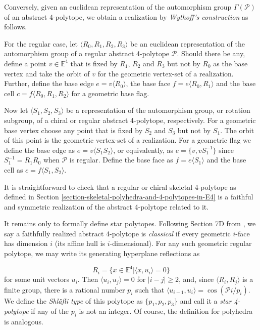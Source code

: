 \documentclass{amsart}
\begin{document}
Conversely, given an euclidean representation of the automorphism group
$\Gamma(\mathcal{P})$ of an abstract 4-polytope, we obtain a realization by
\textit{Wythoff's construction} as follows.
	
For the regular case, let $\langle R_0, R_1,R_2,R_3\rangle$ be an euclidean
representation of the automorphism group of a regular abstract 4-polytope
$\mathcal{P}$. Should there be any, define a point $v\in\mathbb{E}^4$ that is
fixed by $R_1$, $R_2$ and $R_3$ but not by $R_0$ as the base vertex and take the
orbit of $v$ for the geometric vertex-set of a realization. Further, define the
base edge $e=v\langle R_0\rangle$, the base face $f=e\langle R_0,R_1\rangle$ and
the base cell $c=f\langle R_0,R_1,R_2\rangle$ for a geometric base flag.

Now let $\langle S_1,S_2,S_3\rangle$ be a representation of the automorphism
group, or rotation subgroup, of a chiral or regular abstract 4-polytope,
respectively. For a geometric base vertex choose any point that is fixed by
$S_2$ and $S_3$ but not by $S_1$. The orbit of this point is the geometric
vertex-set of a realization. For a geometric flag we define the base edge as
$e=v\langle S_1S_2\rangle$, or equivalently, as $e=\{v,vS_1^{-1}\}$ since
$S_1^{-1}=R_1R_0$ when $\mathcal{P}$ is regular. Define the base face as
$f=e\langle S_1\rangle$ and the base cell as $c=f\langle S_1,S_2\rangle$.
	
It is straightforward to check that a regular or chiral skeletal 4-polytope as
defined in Section \ref{section-skeletal-polyhedra-and-4-polytopes-in-E4} is a
faithful and symmetric realization of the abstract 4-polytope related to it.
	
It remains only to formally define star polytopes. Following Section 7D from
\cite{ARP}, we say a faithfully realized abstract 4-polytope is
\textit{classical} if every geometric $i$-face has dimension $i$ (its affine
hull is $i$-dimensional). For any such geometric regular polytope, we may write
its generating hyperplane reflections as

$$
R_i=\{x\in\mathbb{E}^4|\langle x,u_i\rangle=0\}
$$
for some unit vectors $u_i$. Then $\langle u_i,u_j\rangle=0$ for $|i-j|\geq2$,
and, since $\langle R_i,R_j\rangle$ is a finite group, there is a rational
number $p_i$ such that $\langle u_{i-1},u_i\rangle=\cos(\mathcal{P}i/p_i)$. We
define the \textit{Shläfli type} of this polytope as $\{p_1,p_2,p_3\}$ and call
it a \textit{star 4-polytope} if any of the $p_i$ is not an integer. Of course,
the definition for polyhedra is analogous.
\end{document}
